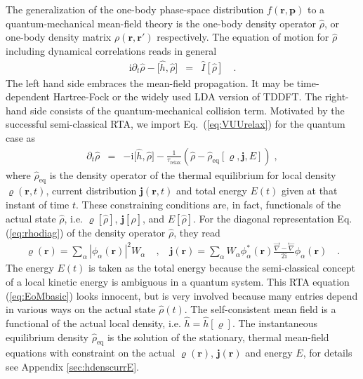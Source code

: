 \documentclass[final,1p]{elsarticle}
\begin{document}
The generalization of the one-body phase-space distribution
$f(\mathbf{r},\mathbf{p})$ to a quantum-mechanical mean-field theory
is the one-body density operator $\hat{\rho}$, or one-body density
matrix $\rho(\mathbf{r},\mathbf{r}')$ respectively. The equation of
motion for $\hat{\rho}$ including dynamical correlations reads in
general \cite{Rei85f,Goe86a}
\begin{eqnarray}
  \mathrm{i}\partial_t\hat{\rho}
  -
  \big[\hat{h},\hat{\rho}\big]
  &=&
  \hat{I}[\hat{\rho}]
  \quad.
\label{eq:EoMfull}
\end{eqnarray}
The left hand side embraces the mean-field propagation. It may be
time-dependent Hartree-Fock or the widely used LDA version of TDDFT.
The right-hand side consists of the quantum-mechanical collision term.
Motivated by the successful semi-classical RTA, we import
Eq.~(\ref{eq:VUUrelax}) for the quantum case as
\begin{eqnarray}
  \partial_t\hat{\rho}
  &=&
  -\mathrm{i}\big[\hat{h},\hat{\rho}\big]
  -
  \frac{1}{\tau_\mathrm{relax}}
  \left(\hat{\rho}-\hat{\rho}_\mathrm{eq}[\varrho,\mathbf{j},E]\right)
  \;,
\label{eq:EoMbasic}
\end{eqnarray}
where $\hat{\rho}_\mathrm{eq}$ is the density operator of the thermal
equilibrium for local density $\varrho(\mathbf{r},t)$, current
distribution $\mathbf{j}(\mathbf{r},t)$ and total energy $E(t)$
given at that instant of time $t$.  These
constraining conditions are, in fact, functionals of the actual state
$\hat{\rho}$, i.e. $\varrho[\hat{\rho}]$, $\mathbf{j}[\hat{\rho}]$,
and $E[\hat{\rho}]$.  For the diagonal representation
Eq.(\ref{eq:rhodiag}) of the density operator $\hat{\rho}$, they read
\begin{eqnarray}
  \varrho(\mathbf{r})
  =
  \sum_\alpha \left|\phi_\alpha(\mathbf{r})\right|^2 W_\alpha
  &\;,\;&
  \mathbf{j}(\mathbf{r})
  =
  \sum_\alpha W_\alpha\phi_\alpha^*(\mathbf{r})
     \frac{\stackrel{\rightarrow}{\nabla}-\stackrel{\leftarrow}{\nabla}}
          {2\mathrm{i}}
     \phi_\alpha(\mathbf{r})
  \quad.
\end{eqnarray}
The energy $E(t)$ is taken as the total energy because the
semi-classical concept of a local kinetic energy is
ambiguous in a quantum system.  This RTA equation (\ref{eq:EoMbasic})
looks innocent, but is very involved because many entries depend in
various ways on the actual state $\hat{\rho}(t)$. The self-consistent
mean field is a functional of the actual local density,
i.e. $\hat{h}=\hat{h}[\varrho]$. The instantaneous equilibrium density
$\hat{\rho}_\mathrm{eq}$ is the solution of the stationary, thermal
mean-field equations with constraint on the actual
$\varrho(\mathbf{r})$, $\mathbf{j}(\mathbf{r})$ and energy $E$, for
details see Appendix \ref{sec:hdenscurrE}.
\end{document}
